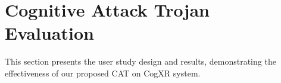 \documentclass[sigconf,review,anonymous]{acmart}
\begin{document}






\section{Cognitive Attack Trojan Evaluation}
\label{sec: attack_cognitive}
This section presents the user study design and results, demonstrating the effectiveness of our proposed CAT on CogXR system. 
\end{document}
